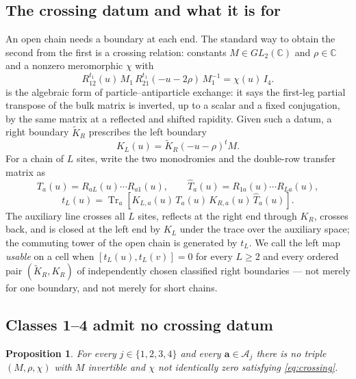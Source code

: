 \documentclass[11pt,reqno]{amsart}
\theoremstyle{plain}
\newtheorem{proposition}[theorem]{Proposition}
\theoremstyle{definition}
\theoremstyle{remark}
\numberwithin{equation}{section}
\newcommand{\Tr}{\operatorname{Tr}}
\newcommand{\C}{\mathbb C}
\begin{document}
\subsection{The crossing datum and what it is for}

An open chain needs a boundary at each end. The standard way to obtain the second
from the first is a crossing relation: constants $M\in GL_2(\C)$ and
$\rho\in\C$ and a nonzero meromorphic $\chi$ with
\begin{equation}
R_{12}^{t_1}(u)\,M_1\,R_{21}^{t_1}(-u-2\rho)\,M_1^{-1}
=\chi(u)\,I_4.                                         \label{eq:crossing}
\end{equation}
 is the algebraic form of particle--antiparticle exchange: it
says the first-leg partial transpose of the bulk matrix is inverted, up to a
scalar and a fixed conjugation, by the same matrix at a reflected and shifted
rapidity. Given such a datum, a right boundary $\widetilde K_R$ prescribes the
left boundary
\begin{equation}
K_L(u)=\widetilde K_R(-u-\rho)^{t}M.                  \label{eq:left-map}
\end{equation}
For a chain of $L$ sites, write the two monodromies and the double-row transfer
matrix as
\begin{equation}
T_a(u)=R_{aL}(u)\cdots R_{a1}(u),\qquad
\widehat T_a(u)=R_{1a}(u)\cdots R_{La}(u),
\label{eq:monodromies}
\end{equation}
\begin{equation}
t_L(u)=\Tr_a\left[K_{L,a}(u)\,T_a(u)\,K_{R,a}(u)\,
\widehat T_a(u)\right].                             \label{eq:transfer}
\end{equation}
The auxiliary line crosses all $L$ sites, reflects at the right end through
$K_R$, crosses back, and is closed at the left end by $K_L$ under the trace over
the auxiliary space; the commuting tower of the open chain is generated by
$t_L$. We call the left map \emph{usable} on a cell when
$[t_L(u),t_L(v)]=0$ for every $L\ge2$ and every ordered pair
$(\widetilde K_R,K_R)$ of independently chosen classified right boundaries --- not
merely for one boundary, and not merely for short chains.

\subsection{Classes 1--4 admit no crossing datum}

\begin{proposition}
\label{prop:no-crossing}
For every $j\in\{1,2,3,4\}$ and every $\mathbf a\in\mathcal A_j$ there is no
triple $(M,\rho,\chi)$ with $M$ invertible and $\chi$ not identically zero
satisfying \cref{eq:crossing}.
\end{proposition}
\end{document}
